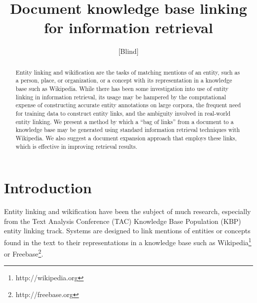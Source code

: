 \documentclass{sig-alternate}
\begin{document}

\author{[Blind]}

\title{Document knowledge base linking for information retrieval}

\maketitle
\begin{abstract}
Entity linking and wikification are the tasks of matching mentions of an entity, such as a person, place, or organization, or a concept with its representation in a knowledge base such as Wikipedia. While there has been some investigation into use of entity linking in information retrieval, its usage may be hampered by the computational expense of constructing accurate entity annotations on large corpora, the frequent need for training data to construct entity links, and the ambiguity involved in real-world entity linking. We present a method by which a ``bag of links'' from a document to a knowledge base may be generated using standard information retrieval techniques with Wikipedia. We also suggest a document expansion approach that employs these links, which is effective in improving retrieval results.
\end{abstract}



\section{Introduction}\label{section.intro}

Entity linking and wikification have been the subject of much research, especially from the Text Analysis Conference (TAC) Knowledge Base Population (KBP) entity linking track. Systems are designed to link mentions of entities or concepts found in the text to their representations in a knowledge base such as Wikipedia\footnote{http://wikipedia.org} or Freebase\footnote{http://freebase.org}.
\end{document}
